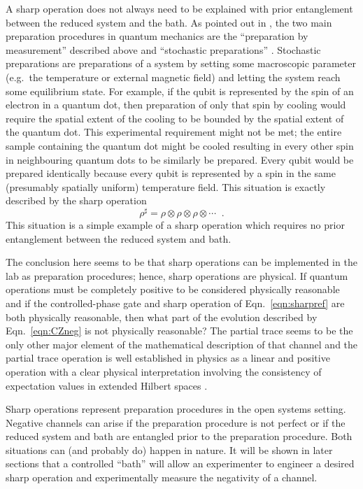 A sharp operation does not always need to be explained with prior entanglement between the reduced system and the bath.  As pointed out in \cite{Sudarshen2007}, the two main preparation procedures in quantum mechanics are the ``preparation by measurement'' described above and ``stochastic preparations'' \cite{Sudarshen2007}.  Stochastic preparations are preparations of a system by setting some macroscopic parameter (e.g.\ the temperature or external magnetic field) and letting the system reach some equilibrium state.  For example, if the qubit is represented by the spin of an electron in a quantum dot, then preparation of only that spin by cooling would require the spatial extent of the cooling to be bounded by the spatial extent of the quantum dot.  This experimental requirement might not be met; the entire sample containing the quantum dot might be cooled resulting in every other spin in neighbouring quantum dots to be similarly be prepared.  Every qubit would be prepared identically because every qubit is represented by a spin in the same (presumably spatially uniform) temperature field.  This situation is exactly described by the sharp operation
$$
\rho^\sharp = \rho\otimes\rho\otimes\rho\otimes\cdots\;\;.
$$
This situation is a simple example of a sharp operation which requires no prior entanglement between the reduced system and bath.

The conclusion here seems to be that sharp operations can be implemented in the lab as preparation procedures; hence, sharp operations are physical.  If quantum operations must be completely positive to be considered physically reasonable and if the controlled-phase gate and sharp operation of Eqn.\ \ref{eqn:sharpref} are both physically reasonable, then what part of the evolution described by Eqn.\ \ref{eqn:CZneg} is not physically reasonable?  The partial trace seems to be the only other major element of the mathematical description of that channel and the partial trace operation is well established in physics as a linear and positive operation \cite{Carlen2010} with a clear physical interpretation involving the consistency of expectation values in extended Hilbert spaces \cite{Cohen1992}.

Sharp operations represent preparation procedures in the open systems setting.  Negative channels can arise if the preparation procedure is not perfect or if the reduced system and bath are entangled prior to the preparation procedure.  Both situations can (and probably do) happen in nature.  It will be shown in later sections that a controlled ``bath'' will allow an experimenter to engineer a desired sharp operation and experimentally measure the negativity of a channel.  
 
